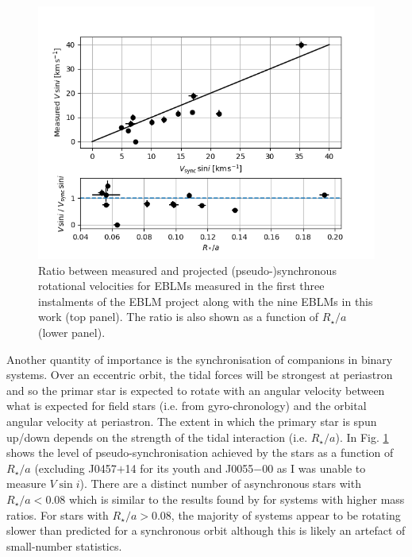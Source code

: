 \begin{figure}
    \centering
    \includegraphics{9-Discussion/images/tidal_trends_2.png}
    \caption{Ratio between measured and projected (pseudo-)synchronous rotational velocities for EBLMs measured in the first three instalments of the EBLM project along with the nine EBLMs in this work (top panel). The ratio is also shown as a function of $R_\star / a$ (lower panel). }
    \label{discussion:fig:tidal2}
\end{figure}

Another quantity of importance is the synchronisation of companions in binary systems. Over an eccentric orbit, the tidal forces will be strongest at periastron and so the primar star is expected to rotate with an angular velocity between what is expected for field stars (i.e. from gyro-chronology) and the orbital angular velocity at periastron. The extent in which the primary star is spun up/down depends on the strength of the tidal interaction (i.e. $R_\star / a$). In Fig. \ref{discussion:fig:tidal2} shows the level of pseudo-synchronisation achieved by the stars as a function of $R_\star  /a$ (excluding J0457$+$14 for its youth and J0055$-$00 as I was unable to measure $V \sin i$). There are a distinct number of asynchronous stars with $R_\star / a < 0.08$ which is similar to the results found by \citet{2010A&ARv..18...67T} for systems with higher mass ratios. For stars with $R_\star / a > 0.08$, the majority of systems appear to be rotating slower than predicted for a synchronous orbit although this is likely an artefact of small-number statistics.










